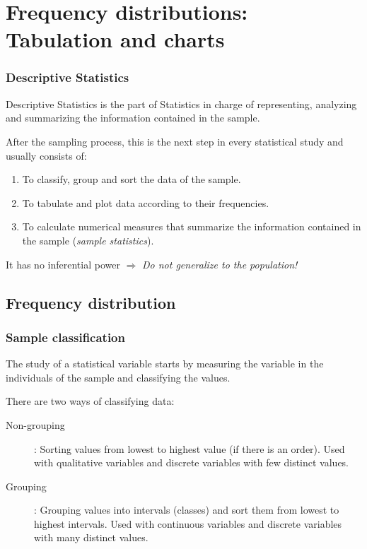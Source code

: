 \section{Frequency distributions: Tabulation and charts}



\begin{frame} 
\frametitle{Descriptive Statistics}
Descriptive Statistics is the part of Statistics in charge of representing, analyzing and summarizing the information contained in the sample.

After the sampling process, this is the next step in every statistical study and usually consists of:
\begin{enumerate}
\item To classify, group and sort the data of the sample.
\item To tabulate and plot data according to their frequencies.
\item To calculate numerical measures that summarize the information contained in the sample (\emph{sample statistics}).
\end{enumerate} 

It has no inferential power $\Rightarrow$ \alert{\emph{Do not generalize to the population!}} 
\end{frame}


\subsection{Frequency distribution}
\begin{frame}
\frametitle{Sample classification}
The study of a statistical variable starts by measuring the variable in the individuals of the sample and classifying the values.

There are two ways of classifying data:
\begin{description}
\item[Non-grouping]: Sorting values from lowest to highest value (if there is an order).
Used with qualitative variables and discrete variables with few distinct values.
\item[Grouping]: Grouping values into intervals (classes) and sort them from lowest to highest intervals. 
Used with continuous variables and discrete variables with many distinct values. 
\end{description}
\end{frame}


